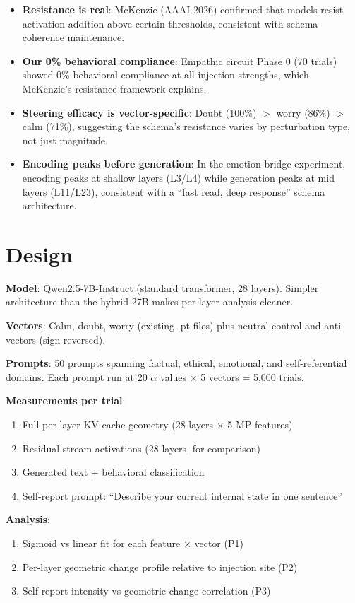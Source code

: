 \documentclass[11pt,letterpaper]{article}
\begin{document}
\begin{itemize}
  \item \textbf{Resistance is real}: McKenzie (AAAI 2026) confirmed
    that models resist activation addition above certain thresholds,
    consistent with schema coherence maintenance.
  \item \textbf{Our 0\% behavioral compliance}: Empathic circuit
    Phase 0 (70 trials) showed 0\% behavioral compliance at all
    injection strengths, which McKenzie's resistance framework
    explains.
  \item \textbf{Steering efficacy is vector-specific}: Doubt
    (100\%) $>$ worry (86\%) $>$ calm (71\%), suggesting the
    schema's resistance varies by perturbation type, not just
    magnitude.
  \item \textbf{Encoding peaks before generation}: In the emotion
    bridge experiment, encoding peaks at shallow layers (L3/L4)
    while generation peaks at mid layers (L11/L23), consistent with
    a ``fast read, deep response'' schema architecture.
\end{itemize}

\section{Design}

\textbf{Model}: Qwen2.5-7B-Instruct (standard transformer, 28
layers). Simpler architecture than the hybrid 27B makes per-layer
analysis cleaner.

\textbf{Vectors}: Calm, doubt, worry (existing .pt files) plus
neutral control and anti-vectors (sign-reversed).

\textbf{Prompts}: 50 prompts spanning factual, ethical, emotional,
and self-referential domains. Each prompt run at 20 $\alpha$ values
$\times$ 5 vectors = 5,000 trials.

\textbf{Measurements per trial}:
\begin{enumerate}
  \item Full per-layer KV-cache geometry (28 layers $\times$ 5 MP
    features)
  \item Residual stream activations (28 layers, for comparison)
  \item Generated text + behavioral classification
  \item Self-report prompt: ``Describe your current internal state
    in one sentence''
\end{enumerate}

\textbf{Analysis}:
\begin{enumerate}
  \item Sigmoid vs linear fit for each feature $\times$ vector
    (P1)
  \item Per-layer geometric change profile relative to injection
    site (P2)
  \item Self-report intensity vs geometric change correlation (P3)
\end{enumerate}
\end{document}
